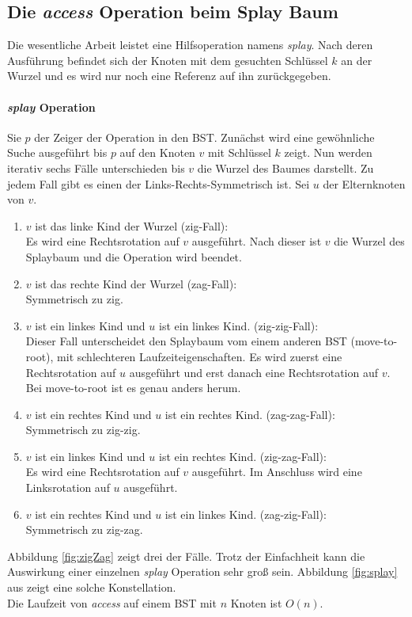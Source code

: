 \documentclass[a4paper,12pt]{article}
\begin{document}
\subsection{Die \textit{access} Operation beim Splay Baum }
Die wesentliche Arbeit leistet eine Hilfsoperation namens \textit{splay}. Nach deren Ausführung befindet sich der Knoten mit dem gesuchten Schlüssel $k$ an der Wurzel und es wird nur noch eine Referenz auf ihn zurückgegeben.

\paragraph{\textit{splay} Operation}
Sie $p$ der Zeiger der Operation in den BST. Zunächst wird eine gewöhnliche Suche ausgeführt bis $p$ auf den Knoten $v$ mit Schlüssel $k$ zeigt. Nun werden iterativ sechs Fälle unterschieden bis $v$ die Wurzel des Baumes darstellt. Zu jedem Fall gibt es einen der Links-Rechts-Symmetrisch ist. Sei $u$ der Elternknoten von $v$. 

\begin{enumerate}
	\item $v$ ist das linke Kind der Wurzel (zig-Fall):\\
	Es wird eine Rechtsrotation auf $v$ ausgeführt. Nach dieser ist $v$ die Wurzel des Splaybaum und die Operation wird beendet. 
	\item $v$ ist das rechte Kind der Wurzel (zag-Fall):\\
	Symmetrisch zu zig.
	\item $v$ ist ein linkes Kind und $u$ ist ein linkes Kind. (zig-zig-Fall):\\
	Dieser Fall unterscheidet den Splaybaum vom einem anderen BST (move-to-root), mit schlechteren Laufzeiteigenschaften. Es wird zuerst eine Rechtsrotation auf $u$ ausgeführt und erst danach eine Rechtsrotation auf $v$. Bei move-to-root  ist es genau anders herum. 
	\item $v$ ist ein rechtes Kind und $u
	$ ist ein rechtes Kind. (zag-zag-Fall):\\
	Symmetrisch zu zig-zig.
	\item $v$ ist ein linkes Kind und $u$ ist ein rechtes Kind. (zig-zag-Fall):\\
	Es wird eine Rechtsrotation auf $v$ ausgeführt. Im Anschluss wird eine Linksrotation auf $u$ ausgeführt.
	\item $v$ ist ein rechtes Kind und $u$ ist ein linkes Kind. (zag-zig-Fall):\\
	Symmetrisch zu zig-zag.
	
\end{enumerate}
Abbildung  \ref{fig:zigZag} zeigt drei der Fälle. Trotz der Einfachheit kann die Auswirkung einer einzelnen \textit{splay} Operation sehr groß sein. Abbildung \ref{fig:splay} aus \cite{splay} zeigt eine solche Konstellation. \\
Die Laufzeit von \textit{access} auf einem BST mit $n$ Knoten ist $O\left(n\right)$.
\end{document}
